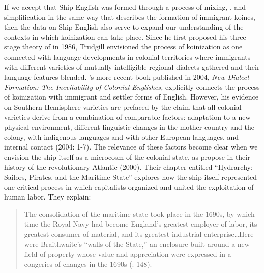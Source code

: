 If we accept that Ship English was formed through a process of  mixing, , and simplification in the same way that \citet{Trudgill1986} describes the formation of immigrant koines, then the data on Ship English also serve to expand our understanding of the contexts in which koinization can take place. Since he first proposed his three-stage theory of  in 1986, Trudgill envisioned the process of koinization as one connected with language developments in colonial territories where immigrants with different varieties of mutually intelligible regional dialects gathered and their language features blended. \citeauthor{Trudgill2004}’s more recent book published in 2004, \textit{New Dialect Formation: The Inevitability of Colonial Englishes,} explicitly connects the process of koinization with immigrant and settler forms of English. However, his evidence on Southern Hemisphere varieties are prefaced by the claim that all colonial varieties derive from a combination of comparable factors: adaptation to a new physical environment, different linguistic changes in the mother country and the colony,  with indigenous languages and with other European languages, and internal  contact (2004: 1-7). The relevance of these factors become clear when we envision the ship itself as a microcosm of the colonial state, as \citeauthor{LinebaughRediker2000} propose in their history of the revolutionary Atlantic (2000). Their chapter entitled “Hydrarchy: Sailors, Pirates, and the Maritime State” explores how the ship itself represented one critical process in which capitalists organized and united the exploitation of human labor. They explain:

\begin{quotation}
The consolidation of the maritime state took place in the 1690s, by which time the Royal Navy had become England’s greatest employer of labor, its greatest consumer of material, and its greatest industrial enterprise…Here were Braithwaite’s “walls of the State,” an enclosure built around a new field of property whose value and appreciation were expressed in a congeries of changes in the 1690s (\citealt{LinebaughRediker2000}: 148).
\end{quotation}

